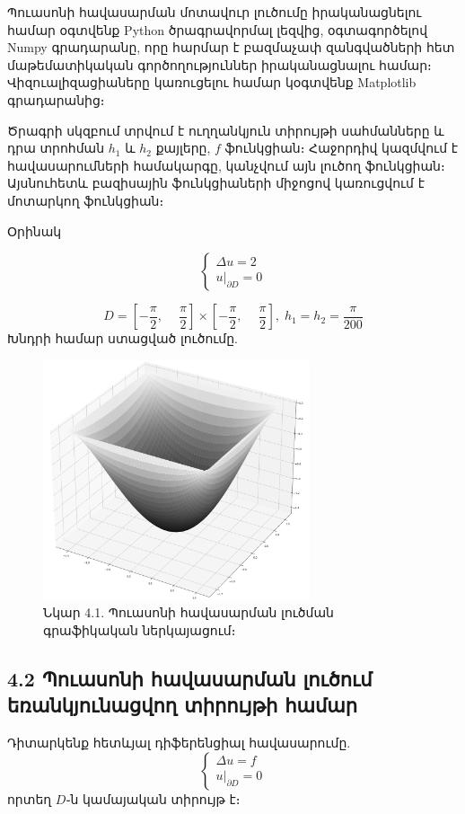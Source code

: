 \documentclass[fleqn, bachelor,subf,12pt,notitlepage]{article}
\begin{document}
Պուասոնի հավասարման մոտավուր լուծումը իրականացնելու համար օգտվենք Python ծրագրավորմալ լեզվից, օգտագործելով Numpy գրադարանը, որը հարմար է բազմաչափ զանգվածների հետ մաթեմատիկական գործողություններ իրականացնալու համար։ Վիզուալիզացիաները կառուցելու համար կօգտվենք Matplotlib գրադարանից։

Ծրագրի սկզբում տրվում է ուղղանկյուն տիրույթի սահմանները և դրա տրոհման $h_{1}$ և $h_{2}$ քայլերը, $f$ ֆունկցիան։ Հաջորդիվ կազմվում է հավասարումների համակարգը, կանչվում այն լուծող ֆունկցիան։ Այսնուհետև բազիսային ֆունկցիաների միջոցով կառուցվում է մոտարկող ֆունկցիան։

Օրինակ


				$$
					\begin{cases}
								\Delta u =2 \\
								u \Big |_{\partial D} = 0
					\end{cases}
				$$

				$$ D = \left[-\dfrac{\pi}{2}, \phantom{-}\dfrac{\pi}{2}\right] \times \left[-\dfrac{\pi}{2}, \phantom{-}\dfrac{\pi}{2}\right], \; h_{1}=h_{2}=\dfrac{\pi}{200}$$
Խնդրի համար ստացված լուծումը.
\begin{figure}[H]
\centering
\includegraphics[width=0.7\textwidth]{images/poisson_solution}
\captionsetup{labelformat=empty}
\caption{Նկար 4.1. Պուասոնի հավասարման լուծման գրաֆիկական ներկայացում։}
\end{figure}
\newpage
\subsection*{4.2 Պուասոնի հավասարման լուծում եռանկյունացվող տիրույթի համար}

Դիտարկենք հետևյալ դիֆերենցիալ հավասարումը.
\begin{equation}
\begin{cases}
			\Delta u =f \\
			u \Big |_{\partial D} = 0
\end{cases}
\end{equation}
որտեղ $D$֊ն կամայական տիրույթ է։
\end{document}
